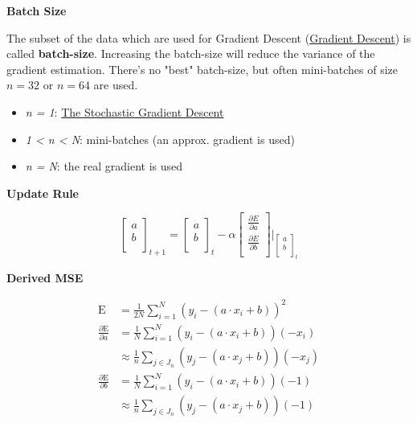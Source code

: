 \documentclass[11pt,landscape]{article}
\begin{document}
\begin{multicols}{3}
\textbf{Batch Size}

The subset of the data which are used for Gradient Descent (\href{../../../roam/20211208163604-gradient_descent.org}{Gradient Descent}) is called \textbf{batch-size}.
Increasing the batch-size will reduce the variance of the gradient estimation.
There's no "best" batch-size, but often mini-batches of size \(n=32\) or \(n=64\) are used. 

\begin{itemize}
\item \emph{n = 1}: \href{../../../roam/20211208165153-the_stochastic_gradient_descent.org}{The Stochastic Gradient Descent}
\item \emph{1 < n < N}: mini-batches (an approx. gradient is used)
\item \emph{n = N}: the real gradient is used
\end{itemize}

\textbf{Update Rule}

\begin{equation}
  \begin{bmatrix}
    a \\
    b \\
  \end{bmatrix}_{t+1} 
  =    \begin{bmatrix}
    a \\
    b \\
  \end{bmatrix}_{t} - \alpha 
  \begin{bmatrix}
    \frac{\partial E}{\partial a} \\
    \frac{\partial E}{\partial b} \\
  \end{bmatrix} \Big\rvert _{\begin{bmatrix}
      a \\
      b \\
    \end{bmatrix}_{t} }
\end{equation}

\textbf{Derived MSE}

\begin{align}
  \textrm{E} &= \frac{1}{2N} \sum_{i=1}^{N} (y_i - (a \cdot x_i + b))^2 \\
  \frac{\partial \textrm{E}}{\partial a} &= \frac{1}{N} \sum_{i=1}^{N} (y_i - (a \cdot x_i + b)) (-x_i) \\
  &\approx \frac{1}{n} \sum_{j \in J_n} (y_j - (a \cdot x_j + b)) (-x_j)  \\
  \frac{\partial \textrm{E}}{\partial b} &= \frac{1}{N} \sum_{i=1}^{N} (y_i - (a \cdot x_i + b)) (-1) \\
  &\approx \frac{1}{n} \sum_{j \in J_n} (y_{j} - (a \cdot x_{j} + b)) (-1)  \\
\end{align}



\end{multicols}
\end{document}
